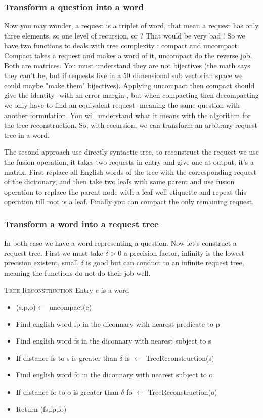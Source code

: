 \subsubsection{Transform a question into a word}

Now you may wonder, a request is a triplet of word, that mean a request has only three elements, so one level of recursion, or ? That would be very bad ! So we have two functions to deals with tree complexity : compact and uncompact. Compact takes a request and makes a word of it, uncompact do the reverse job. Both are matrices. You must understand they are not bijectives (the math says they can't be, but if requests live in a 50 dimensional sub vectorian space we could maybe "make them" bijectives). Applying uncompact then compact should give the identity -with an error margin-, but when compacting then decompacting we only have to find an equivalent request -meaning the same question with another formulation. You will understand what it means with the algorithm for the tree reconstruction. So, with recursion, we can transform an arbitrary request tree in a word.

The second approach use directly syntactic tree, to reconstruct the request we use the fusion operation, it takes two requests in entry and give one at output, it's a matrix. First replace all English words of the tree with the corresponding request of the dictionary, and then take two leafs with same parent and use fusion operation to replace the parent node with a leaf well etiquette and repeat this operation till root is a leaf. Finally you can compact the only remaining request. 

\subsubsection{Transform a word into a request tree}

In both case we have a word representing a question. Now let's construct a request tree. First we must take $\delta>0$ a precision factor, infinity is the lowest precision existent, small $\delta$ is good but can conduct to an infinite request tree, meaning the functions do not do their job well.

\textsc{Tree Reconstruction}
Entry $e$ is a word

\begin{itemize}
\item (s,p,o)$\leftarrow$ uncompact(e)
\item Find english word fp in the diconnary with nearest predicate to p
\item Find english word fs in the diconnary with nearest subject to s
\item If distance fs to s is greater than $\delta$ fs $\leftarrow$ TreeReconstruction(s)
\item Find english word fo in the diconnary with nearest subject to o
\item If distance fo to o is greater than $\delta$ fo $\leftarrow$ TreeReconstruction(o)
\item Return (fs,fp,fo)
\end{itemize}


